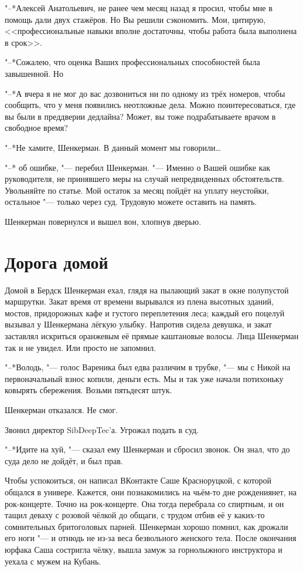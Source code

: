 "--*Алексей Анатольевич, не ранее чем месяц назад я просил, чтобы мне в помощь дали двух стажёров.
Но Вы решили сэкономить.
Мои, цитирую, <<профессиональные навыки вполне достаточны, чтобы работа была выполнена в срок>>.

"--*Сожалею, что оценка Ваших профессиональных способностей была завышенной.
Но\ldotst

"--*А вчера я не мог до вас дозвониться ни по одному из трёх номеров, чтобы сообщить, что у меня появились неотложные дела.
Можно поинтересоваться, где вы были в преддверии дедлайна?
Может, вы тоже подрабатываете врачом в свободное время?

"--*Не хамите, Шенкерман.
В данный момент мы говорили\ldots

"--* \ldotst об ошибке, "--- перебил Шенкерман.
"--- Именно о Вашей ошибке как руководителя, не принявшего меры на случай непредвиденных обстоятельств.
Увольняйте по статье.
Мой остаток за месяц пойдёт на уплату неустойки, остальное "--- только через суд.
Трудовую можете оставить на память.

Шенкерман повернулся и вышел вон, хлопнув дверью.

\section{Дорога домой}

Домой в Бердск Шенкерман ехал, глядя на пылающий закат в окне полупустой маршрутки.
Закат время от времени вырывался из плена высотных зданий, мостов, придорожных кафе и густого переплетения леса;
каждый его поцелуй вызывал у Шенкермана лёгкую улыбку.
Напротив сидела девушка, и закат заставлял искриться оранжевым её прямые каштановые волосы.
Лица Шенкерман так и не увидел.
Или просто не запомнил.

"--*Володь, "--- голос Вареника был едва различим в трубке, "--- мы с Никой на первоначальный взнос копили, деньги есть.
Мы и так уже начали потихоньку ковырять сбережения.
Возьми пятьдесят штук.

Шенкерман отказался.
Не смог.

Звонил директор SibDeepTec'а.
Угрожал подать в суд.

"--*Идите на хуй, "--- сказал ему Шенкерман и сбросил звонок.
Он знал, что до суда дело не дойдёт, и был прав.

Чтобы успокоиться, он написал ВКонтакте Саше Красноруцкой, с которой общался в универе.
Кажется, они познакомились на чьём-то дне рождения\ldotst нет, на рок-концерте.
Точно на рок-концерте.
Она тогда перебрала со спиртным, и он тащил деваху с розовой чёлкой до общаги, с трудом отбив её у каких-то сомнительных бритоголовых парней.
Шенкерман хорошо помнил, как дрожали его ноги "--- и отнюдь не из-за веса безвольного женского тела.
После окончания юрфака Саша состригла чёлку, вышла замуж за горнолыжного инструктора и уехала с мужем на Кубань.

